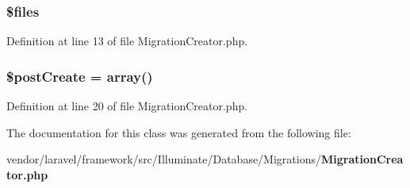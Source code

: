 \subsubsection[{\$files}]{\setlength{\rightskip}{0pt plus 5cm}\$files\hspace{0.3cm}{\ttfamily [protected]}}\label{class_illuminate_1_1_database_1_1_migrations_1_1_migration_creator_a9590b15215a21e9b42eb546aeef79704}


Definition at line 13 of file Migration\+Creator.\+php.

\subsubsection[{\$post\+Create}]{\setlength{\rightskip}{0pt plus 5cm}\$post\+Create = array()\hspace{0.3cm}{\ttfamily [protected]}}\label{class_illuminate_1_1_database_1_1_migrations_1_1_migration_creator_a2e3f2df5c74a66138e917ab122162c07}


Definition at line 20 of file Migration\+Creator.\+php.



The documentation for this class was generated from the following file\+:\begin{DoxyCompactItemize}
\item 
vendor/laravel/framework/src/\+Illuminate/\+Database/\+Migrations/{\bf Migration\+Creator.\+php}\end{DoxyCompactItemize}
